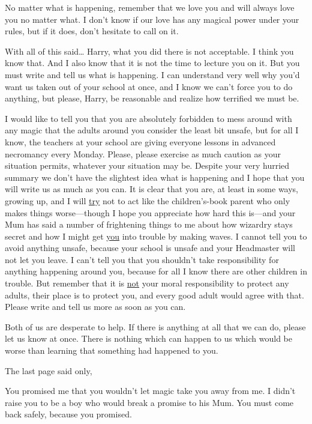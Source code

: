 \begin{writtenNote}
No matter what is happening, remember that we love you and will always 
love you no matter what. I don't know if our love has any magical power under 
your rules, but if it does, don't hesitate to call on it.

With all of this said{\ldots} Harry, what you did there is not 
acceptable. I think you know that. And I also know that it is not the time to 
lecture you on it. But you must write and tell us what is happening. I can 
understand very well why you'd want us taken out of your school at once, and I 
know we can't force you to do anything, but please, Harry, be reasonable and 
realize how terrified we must be.

I would like to tell you that you are absolutely forbidden to mess around 
with any magic that the adults around you consider the least bit unsafe, but 
for all I know, the teachers at your school are giving everyone lessons in 
advanced necromancy every Monday. Please, please exercise as much caution as 
your situation permits, whatever your situation may be. Despite your very 
hurried summary we don't have the slightest idea what is happening and I hope 
that you will write us as much as you can. It is clear that you are, at least 
in some ways, growing up, and I will \underline{try} not to act like the 
children's-book parent who only makes things worse---though I hope you 
appreciate how hard this is---and your Mum has said a number of frightening 
things to me about how wizardry stays secret and how I might get 
\underline{you} into trouble by making waves. I cannot tell you to avoid 
anything unsafe, because your school is unsafe and your Headmaster will not let 
you leave. I can't tell you that you shouldn't take responsibility for anything 
happening around you, because for all I know there are other children in 
trouble. But remember that it is \underline{not} your moral responsibility to 
protect any adults, their place is to protect you, and every good adult would 
agree with that. Please write and tell us more as soon as you can.

Both of us are desperate to help. If there is anything at all that we can 
do, please let us know at once. There is nothing which can happen to us which 
would be worse than learning that something had happened to you.

\end{writtenNote}

The last page said only,

\begin{writtenNote}
You promised me that you wouldn't let magic take you away from me. I 
didn't raise you to be a boy who would break a promise to his Mum. You must 
come back safely, because you promised.

\end{writtenNote}

